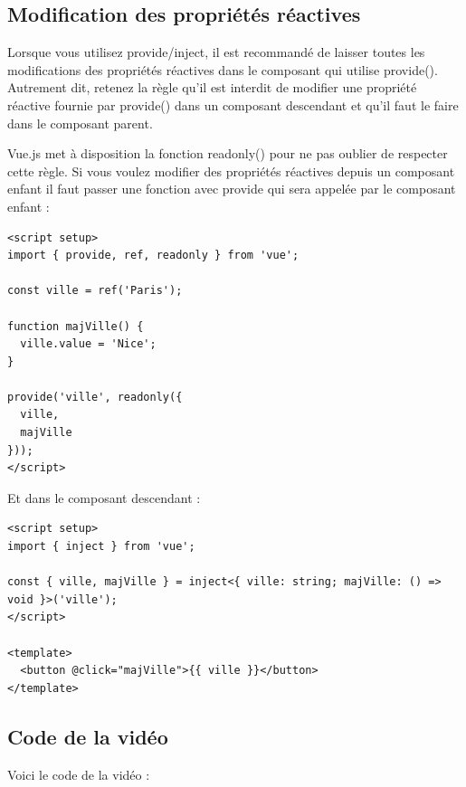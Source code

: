 \documentclass{article}
\begin{document}
\subsection{Modification des propriétés réactives}
Lorsque vous utilisez {\color{monOrange}provide/inject}, il est recommandé de laisser toutes les modifications des propriétés réactives dans le composant qui utilise {\color{monOrange}provide()}. Autrement dit, retenez la règle qu'il est interdit de modifier une propriété réactive fournie par {\color{monOrange}provide()} dans un composant descendant et qu'il faut le faire dans le composant parent.

{\color{monOrange}Vue.js} met à disposition la fonction {\color{monOrange}readonly()} pour ne pas oublier de respecter cette règle. Si vous voulez modifier des propriétés réactives depuis un composant enfant il faut passer une fonction avec {\color{monOrange}provide} qui sera appelée par le composant enfant :
\begin{verbatim}
<script setup>
import { provide, ref, readonly } from 'vue';

const ville = ref('Paris');

function majVille() {
  ville.value = 'Nice';
}

provide('ville', readonly({
  ville,
  majVille
}));
</script>
\end{verbatim}
Et dans le composant descendant :
\begin{verbatim}
<script setup>
import { inject } from 'vue';

const { ville, majVille } = inject<{ ville: string; majVille: () => void }>('ville');
</script>

<template>
  <button @click="majVille">{{ ville }}</button>
</template>
\end{verbatim}
\subsection{Code de la vidéo}
Voici le code de la vidéo :
\end{document}
